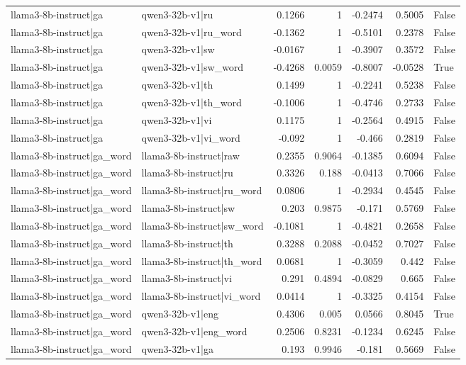 \begin{table}
\begin{tabular}{l l r r r r l}
llama3-8b-instruct|ga & qwen3-32b-v1|ru & 0.1266 & 1 & -0.2474 & 0.5005 & False \\
llama3-8b-instruct|ga & qwen3-32b-v1|ru_word & -0.1362 & 1 & -0.5101 & 0.2378 & False \\
llama3-8b-instruct|ga & qwen3-32b-v1|sw & -0.0167 & 1 & -0.3907 & 0.3572 & False \\
llama3-8b-instruct|ga & qwen3-32b-v1|sw_word & -0.4268 & 0.0059 & -0.8007 & -0.0528 & True \\
llama3-8b-instruct|ga & qwen3-32b-v1|th & 0.1499 & 1 & -0.2241 & 0.5238 & False \\
llama3-8b-instruct|ga & qwen3-32b-v1|th_word & -0.1006 & 1 & -0.4746 & 0.2733 & False \\
llama3-8b-instruct|ga & qwen3-32b-v1|vi & 0.1175 & 1 & -0.2564 & 0.4915 & False \\
llama3-8b-instruct|ga & qwen3-32b-v1|vi_word & -0.092 & 1 & -0.466 & 0.2819 & False \\
llama3-8b-instruct|ga_word & llama3-8b-instruct|raw & 0.2355 & 0.9064 & -0.1385 & 0.6094 & False \\
llama3-8b-instruct|ga_word & llama3-8b-instruct|ru & 0.3326 & 0.188 & -0.0413 & 0.7066 & False \\
llama3-8b-instruct|ga_word & llama3-8b-instruct|ru_word & 0.0806 & 1 & -0.2934 & 0.4545 & False \\
llama3-8b-instruct|ga_word & llama3-8b-instruct|sw & 0.203 & 0.9875 & -0.171 & 0.5769 & False \\
llama3-8b-instruct|ga_word & llama3-8b-instruct|sw_word & -0.1081 & 1 & -0.4821 & 0.2658 & False \\
llama3-8b-instruct|ga_word & llama3-8b-instruct|th & 0.3288 & 0.2088 & -0.0452 & 0.7027 & False \\
llama3-8b-instruct|ga_word & llama3-8b-instruct|th_word & 0.0681 & 1 & -0.3059 & 0.442 & False \\
llama3-8b-instruct|ga_word & llama3-8b-instruct|vi & 0.291 & 0.4894 & -0.0829 & 0.665 & False \\
llama3-8b-instruct|ga_word & llama3-8b-instruct|vi_word & 0.0414 & 1 & -0.3325 & 0.4154 & False \\
llama3-8b-instruct|ga_word & qwen3-32b-v1|eng & 0.4306 & 0.005 & 0.0566 & 0.8045 & True \\
llama3-8b-instruct|ga_word & qwen3-32b-v1|eng_word & 0.2506 & 0.8231 & -0.1234 & 0.6245 & False \\
llama3-8b-instruct|ga_word & qwen3-32b-v1|ga & 0.193 & 0.9946 & -0.181 & 0.5669 & False \\

\end{tabular}
\end{table}
